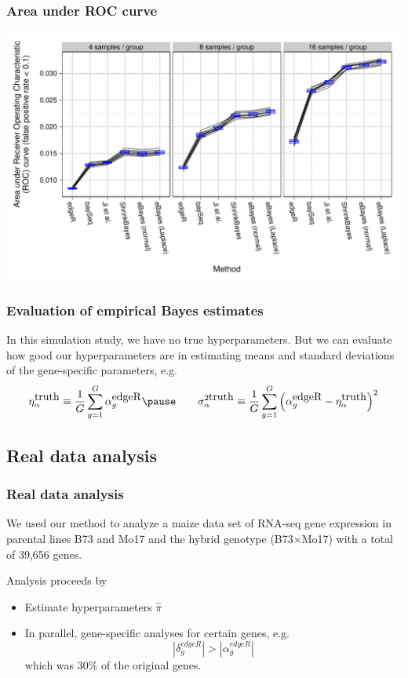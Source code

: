 \documentclass[handout]{beamer}\usepackage[]{graphicx}\usepackage[]{color}
\begin{document}
\begin{frame}
\frametitle{Area under ROC curve}
\begin{center}
\includegraphics{auc-facet-TRUE}
\end{center}
\end{frame}


\begin{frame}
\frametitle{Evaluation of empirical Bayes estimates}

In this simulation study, we have no true hyperparameters. \pause But we can evaluate how good our hyperparameters are in estimating means and standard deviations of the gene-specific parameters, \pause e.g. 
\[ 
\eta_\alpha^{\mbox{truth}} \equiv \frac{1}{G} \sum_{g=1}^G \alpha_g^{\mbox{edgeR}} \pause \qquad 
\sigma_\alpha^{2\mbox{truth}} \equiv \frac{1}{G} \sum_{g=1}^G \left( \alpha_g^{\mbox{edgeR}} - \eta_\alpha^{\mbox{truth}}\right)^{2}
\]

\pause

{\tiny

}
\end{frame}






\subsection{Real data analysis}
\begin{frame}
\frametitle{Real data analysis}

We used our method to analyze a maize data set of RNA-seq gene expression in parental lines B73 and Mo17 and the hybrid genotype (B73$\times$Mo17) with a total of 39,656 genes.

\vspace{0.2in} \pause

Analysis proceeds by 
\begin{itemize}
\item Estimate hyperparameters $\hat{\pi}$
\item In parallel, gene-specific analyses for certain genes\pause, e.g. 
\[ 
\left| \delta_g^{edgeR}\right| > \left| \alpha_g^{edgeR}\right| 
\]
which was 30\% of the original genes.
\end{itemize}
\end{frame}
\end{document}
